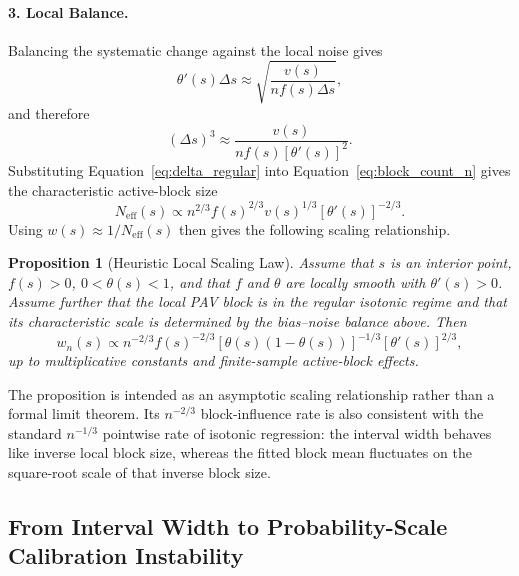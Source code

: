 \documentclass[11pt]{article}
\newtheorem{proposition}{Proposition}
\begin{document}
	\paragraph{3. Local Balance.}
	Balancing the systematic change against the local noise gives
	\begin{equation}
		\theta'(s)\Delta s
		\approx
		\sqrt{\frac{v(s)}{n f(s)\Delta s}},
	\end{equation}
	and therefore
	\begin{equation}
		(\Delta s)^3
		\approx
		\frac{v(s)}{n f(s)[\theta'(s)]^2}.
		\label{eq:delta_regular}
	\end{equation}
	Substituting Equation~\ref{eq:delta_regular} into Equation~\ref{eq:block_count_n} gives the characteristic active-block size
	\begin{equation}
		N_{\mathrm{eff}}(s)
		\propto
		n^{2/3}f(s)^{2/3}v(s)^{1/3}[\theta'(s)]^{-2/3}.
		\label{eq:block_scaling}
	\end{equation}
	Using $w(s)\approx 1/N_{\mathrm{eff}}(s)$ then gives the following scaling relationship.
	
	\begin{proposition}[Heuristic Local Scaling Law]
		Assume that $s$ is an interior point, $f(s)>0$, $0<\theta(s)<1$, and that $f$ and $\theta$ are locally smooth with $\theta'(s)>0$. Assume further that the local PAV block is in the regular isotonic regime and that its characteristic scale is determined by the bias--noise balance above. Then
		\begin{equation}
			w_n(s)
			\propto
			n^{-2/3}f(s)^{-2/3}
			[\theta(s)(1-\theta(s))]^{-1/3}
			[\theta'(s)]^{2/3},
			\label{eq:scaling_law_final}
		\end{equation}
		up to multiplicative constants and finite-sample active-block effects.
	\end{proposition}
	
	The proposition is intended as an asymptotic scaling relationship rather than a formal limit theorem. Its $n^{-2/3}$ block-influence rate is also consistent with the standard $n^{-1/3}$ pointwise rate of isotonic regression: the interval width behaves like inverse local block size, whereas the fitted block mean fluctuates on the square-root scale of that inverse block size.
	
	\subsection{From Interval Width to Probability-Scale Calibration Instability}
	\label{subsec:ucal_theory}
	
\end{document}
